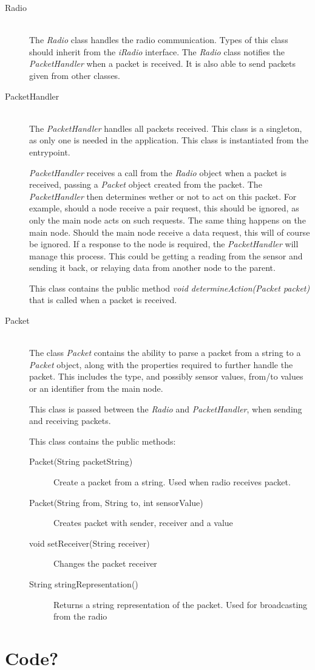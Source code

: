 \begin{description}
\item[Radio] \hfill \\
The \textit{Radio} class handles the radio communication. Types of this class should inherit from the \textit{iRadio} interface. The \textit{Radio} class notifies the \textit{PacketHandler} when a packet is received. It is also able to send packets given from other classes.

\item[PacketHandler] \hfill \\
The \textit{PacketHandler} handles all packets received. This class is a singleton, as only one is needed in the application. This class is instantiated from the entrypoint.

\textit{PacketHandler} receives a call from the \textit{Radio} object when a packet is received, passing a \textit{Packet} object created from the packet. The \textit{PacketHandler} then determines wether or not to act on this packet. 
For example, should a node receive a pair request, this should be ignored, as only the main node acts on such requests. The same thing happens on the main node. Should the main node receive a data request, this will of course be ignored.
If a response to the node is required, the \textit{PacketHandler} will manage this process. This could be getting a reading from the sensor and sending it back, or relaying data from another node to the parent.

This class contains the public method \textit{void determineAction(Packet packet)} that is called when a packet is received.

\item[Packet] \hfill \\
The class \textit{Packet} contains the ability to parse a packet from a string to a \textit{Packet} object, along with the properties required to further handle the packet. This includes the type, and possibly sensor values, from/to values or an identifier from the main node.

This class is passed between the \textit{Radio} and \textit{PacketHandler}, when sending and receiving packets.

This class contains the public methods:
\begin{description}
\item[Packet(String packetString)] Create a packet from a string. Used when radio receives packet.
\item[Packet(String from, String to, int sensorValue)] Creates packet with sender, receiver and a value
\item[void setReceiver(String receiver)] Changes the packet receiver
\item[String stringRepresentation()] Returns a string representation of the packet. Used for broadcasting from the radio
\end{description}

\end{description}


\section{Code?}